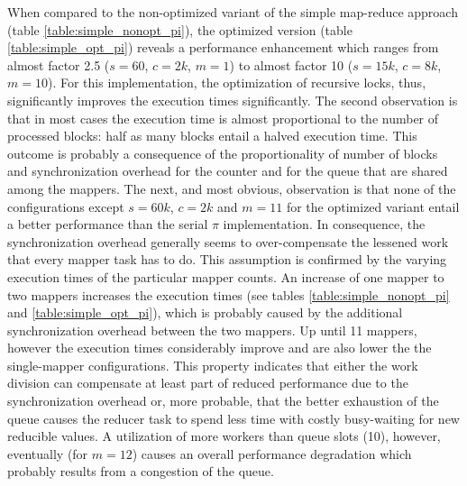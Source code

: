 When compared to the non-optimized variant of the simple map-reduce approach (table \ref{table:simple_nonopt_pi}), the optimized version (table \ref{table:simple_opt_pi}) reveals a performance enhancement which ranges from almost factor 2.5 ($s = 60$, $c = 2k$, $m = 1$) to almost factor 10 ($s = 15k$, $c = 8k$, $m = 10$). For this implementation, the optimization of recursive locks, thus, significantly improves the execution times significantly. The second observation is that in most cases the execution time is almost proportional to the number of processed blocks: half as many blocks entail a halved execution time. This outcome is probably a consequence of the proportionality of number of blocks and synchronization overhead for the counter and for the queue that are shared among the mappers. The next, and most obvious, observation is that none of the configurations except $s = 60k$, $c = 2k$ and $m = 11$ for the optimized variant entail a better performance than the serial $\pi$ implementation. In consequence, the synchronization overhead generally seems to over-compensate the lessened work that every mapper task has to do. This assumption is confirmed by the varying execution times of the particular mapper counts. An increase of one mapper to two mappers increases the execution times (see tables \ref{table:simple_nonopt_pi} and \ref{table:simple_opt_pi}), which is probably caused by the additional synchronization overhead between the two mappers. Up until 11 mappers, however the execution times considerably improve and are also lower the the single-mapper configurations. This property indicates that either the work division can compensate at least part of reduced performance due to the synchronization overhead or, more probable, that the better exhaustion of the queue causes the reducer task to spend less time with costly busy-waiting for new reducible values. A utilization of more workers than queue slots (10), however, eventually (for $m = 12$) causes an overall performance degradation which probably results from a congestion of the queue.

